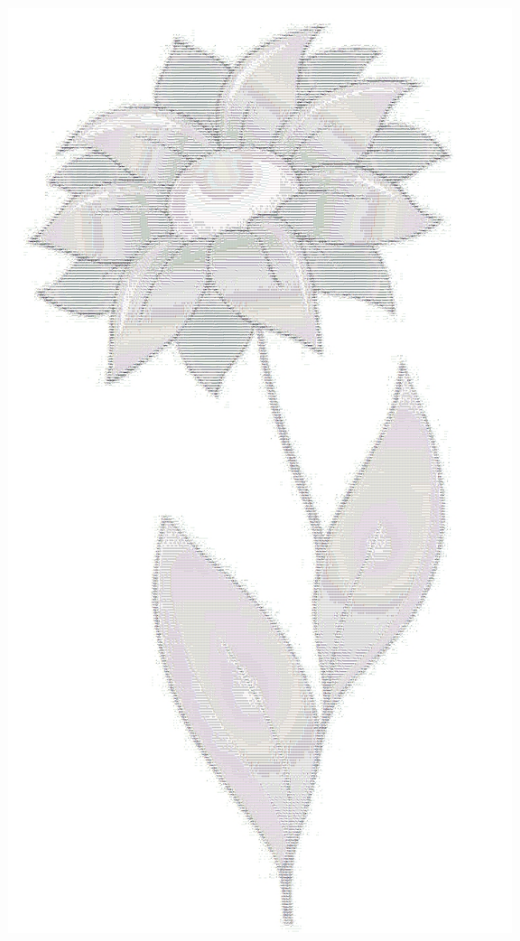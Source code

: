\documentclass[polish, 11pt]{article}
\begin{document}
    \begin{minipage}[t]{.33\textwidth}
        \includegraphics[width=\textwidth]{kwiatek1.jpg}
    \end{minipage}%
\end{document}
